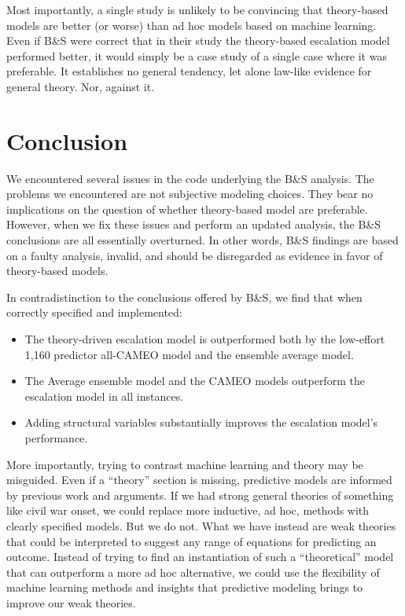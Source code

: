 \documentclass[
]{article}
\providecommand{\tightlist}{%
  \setlength{\itemsep}{0pt}\setlength{\parskip}{0pt}}
\begin{document}
Most importantly, a single study is unlikely to be convincing that theory-based models are better (or worse) than ad hoc models based on machine learning. Even if B\&S were correct that in their study the theory-based escalation model performed better, it would simply be a case study of a single case where it was preferable. It establishes no general tendency, let alone law-like evidence for general theory. Nor, against it.

\hypertarget{conclusion}{%
\section{Conclusion}\label{conclusion}}

We encountered several issues in the code underlying the B\&S analysis. The problems we encountered are not subjective modeling choices. They bear no implications on the question of whether theory-based model are preferable. However, when we fix these issues and perform an updated analysis, the B\&S conclusions are all essentially overturned. In other words, B\&S findings are based on a faulty analysis, invalid, and should be disregarded as evidence in favor of theory-based models.

In contradistinction to the conclusions offered by B\&S, we find that when correctly specified and implemented:

\begin{itemize}
\tightlist
\item
  The theory-driven escalation model is outperformed both by the low-effort 1,160 predictor all-CAMEO model and the ensemble average model.
\item
  The Average ensemble model and the CAMEO models outperform the escalation model in all instances.
\item
  Adding structural variables substantially improves the escalation model's performance.
\end{itemize}

More importantly, trying to contrast machine learning and theory may be misguided. Even if a ``theory'' section is missing, predictive models are informed by previous work and arguments. If we had strong general theories of something like civil war onset, we could replace more inductive, ad hoc, methods with clearly specified models. But we do not. What we have instead are weak theories that could be interpreted to suggest any range of equations for predicting an outcome. Instead of trying to find an instantiation of such a ``theoretical'' model that can outperform a more ad hoc alternative, we could use the flexibility of machine learning methods and insights that predictive modeling brings to improve our weak theories.
\end{document}
